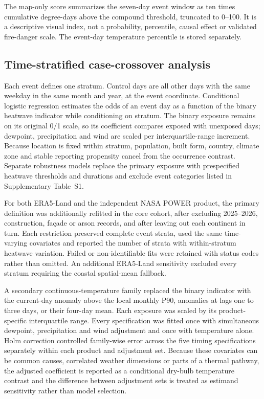 \documentclass[11pt]{article}
\begin{document}
The map-only score summarizes the seven-day event window as ten times cumulative degree-days above the compound threshold, truncated to 0--100. It is a descriptive visual index, not a probability, percentile, causal effect or validated fire-danger scale. The event-day temperature percentile is stored separately.

\subsection*{Time-stratified case-crossover analysis}
Each event defines one stratum. Control days are all other days with the same weekday in the same month and year, at the event coordinate. Conditional logistic regression estimates the odds of an event day as a function of the binary heatwave indicator while conditioning on stratum. The binary exposure remains on its original 0/1 scale, so its coefficient compares exposed with unexposed days; dewpoint, precipitation and wind are scaled per interquartile-range increment. Because location is fixed within stratum, population, built form, country, climate zone and stable reporting propensity cancel from the occurrence contrast. Separate robustness models replace the primary exposure with prespecified heatwave thresholds and durations and exclude event categories listed in Supplementary Table~S1.

For both ERA5-Land and the independent NASA POWER product, the primary definition was additionally refitted in the core cohort, after excluding 2025--2026, construction, façade or arson records, and after leaving out each continent in turn. Each restriction preserved complete event strata, used the same time-varying covariates and reported the number of strata with within-stratum heatwave variation. Failed or non-identifiable fits were retained with status codes rather than omitted. An additional ERA5-Land sensitivity excluded every stratum requiring the coastal spatial-mean fallback.

A secondary continuous-temperature family replaced the binary indicator with the current-day anomaly above the local monthly P90, anomalies at lags one to three days, or their four-day mean. Each exposure was scaled by its product-specific interquartile range. Every specification was fitted once with simultaneous dewpoint, precipitation and wind adjustment and once with temperature alone. Holm correction controlled family-wise error across the five timing specifications separately within each product and adjustment set. Because these covariates can be common causes, correlated weather dimensions or parts of a thermal pathway, the adjusted coefficient is reported as a conditional dry-bulb temperature contrast and the difference between adjustment sets is treated as estimand sensitivity rather than model selection.
\end{document}
